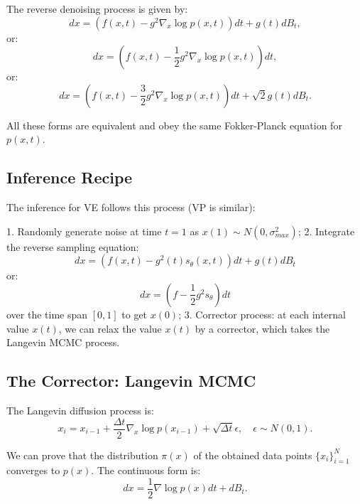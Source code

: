 The reverse denoising process is given by:
\begin{equation}
dx = (f(x,t) - g^2\nabla_x \log p(x,t))dt + g(t)dB_t,
\end{equation}
or:
\begin{equation}
dx = (f(x,t) - \frac{1}{2}g^2\nabla_x \log p(x,t))dt,
\end{equation}
or:
\begin{equation}
dx = (f(x,t) - \frac{3}{2}g^2\nabla_x \log p(x,t))dt + \sqrt{2}g(t)dB_t.
\end{equation}

All these forms are equivalent and obey the same Fokker-Planck equation for $p(x, t)$.

\subsection{Inference Recipe}

The inference for VE follows this process (VP is similar):

1. Randomly generate noise at time $t=1$ as $x(1) \sim N(0, \sigma^2_{max})$;
2. Integrate the reverse sampling equation:
\begin{equation}
dx = \left(f(x,t) - g^2(t) s_\theta(x,t)\right)dt + g(t)dB_t
\end{equation}
or:
\begin{equation}
dx = (f - \frac{1}{2}g^2 s_\theta)dt
\end{equation}
over the time span $[0, 1]$ to get $x(0)$;
3. Corrector process: at each internal value $x(t)$, we can relax the value $x(t)$ by a corrector, which takes the Langevin MCMC process.

\subsection{The Corrector: Langevin MCMC}

The Langevin diffusion process is:
\begin{equation}
x_i = x_{i-1} + \frac{\Delta t}{2}\nabla_x\log p(x_{i-1}) + \sqrt{\Delta t}\epsilon, \quad \epsilon \sim N(0, 1).
\end{equation}

We can prove that the distribution $\pi(x)$ of the obtained data points $\{x_i\}_{i=1}^N$ converges to $p(x)$. The continuous form is:
\begin{equation}
dx = \frac{1}{2}\nabla\log p(x) dt + dB_t.
\end{equation}

